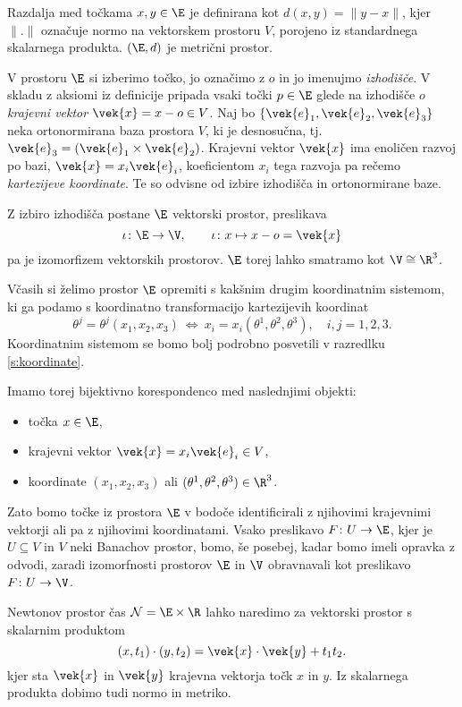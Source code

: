 Razdalja med točkama $x,y\in\E$ je definirana kot $d(x,y)=\|y-x\|$, kjer $\|.\|$ označuje normo na
vektorskem prostoru $V$, porojeno iz standardnega skalarnega produkta. $(\E,d)$ je metrični prostor.

V prostoru $\E$ si izberimo točko, jo označimo z $o$ in jo imenujmo \emph{izhodišče}.
V skladu z aksiomi iz definicije pripada vsaki točki $p\in\E$ glede na izhodišče $o$ \emph{krajevni vektor}
$\vek{x}=x-o\in V$. Naj bo $\{\vek{e}_1,\vek{e}_2,\vek{e}_3\}$ neka ortonormirana baza prostora $V$,
ki je desnosučna, tj.~$\vek{e}_3=(\vek{e}_1\times\vek{e}_2)$. Krajevni vektor $\vek{x}$
ima enoličen razvoj po bazi, $\vek{x}=x_i\vek{e}_i$, koeficientom $x_i$ tega razvoja pa rečemo
\emph{kartezijeve koordinate}. Te so odvisne od izbire izhodišča in ortonormirane baze.

Z izbiro izhodišča postane $\E$ vektorski prostor, preslikava
\[
	\iota\colon\E\to\V,\qquad\iota\colon x\mapsto x-o=\vek{x}
\]
pa je izomorfizem vektorskih prostorov. $\E$ torej lahko smatramo kot $\V\cong\R^3$.

Včasih si želimo prostor $\E$ opremiti s kakšnim drugim koordinatnim sistemom, ki ga podamo
s koordinatno transformacijo kartezijevih koordinat
\begin{equation}\label{e:kt}
	\theta^j = \theta^j(x_1,x_2,x_3) \ \Leftrightarrow \ x_i=x_i(\theta^1,\theta^2,\theta^3), \quad i,j=1,2,3.
\end{equation}
Koordinatnim sistemom se bomo bolj podrobno posvetili v razredlku \ref{s:koordinate}.

Imamo torej bijektivno korespondenco med naslednjimi objekti:
\begin{itemize}
	\item točka $x\in\E$,
	\item krajevni vektor $\vek{x}=x_i\vek{e}_i\in V$,
	\item koordinate $(x_1,x_2,x_3)$ ali $(\theta^1,\theta^2,\theta^3)\in\R^3$.
\end{itemize}
Zato bomo točke iz prostora $\E$ v bodoče identificirali z njihovimi krajevnimi
vektorji ali pa z njihovimi koordinatami.
Vsako preslikavo $F\colon U\to \E$, kjer je $U\subseteq V$ in $V$ neki Banachov prostor,
bomo, še posebej, kadar bomo imeli opravka z odvodi, zaradi izomorfnosti prostorov
$\E$ in $\V$ obravnavali kot preslikavo $F\colon U\to\V$.

Newtonov prostor čas $\mathcal{N}=\E\times\R$ lahko naredimo za vektorski prostor s skalarnim produktom
\[ (x,t_1)\cdot(y,t_2) = \vek{x}\cdot\vek{y} + t_1 t_2. \]
kjer sta $\vek{x}$ in $\vek{y}$ krajevna vektorja točk $x$ in $y$.
Iz skalarnega produkta dobimo tudi normo in metriko.

